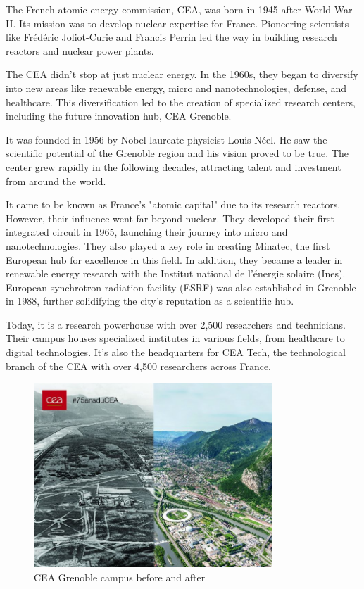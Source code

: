 \medskip

The French atomic energy commission, CEA, was born in 1945 after World War II. Its mission was to develop nuclear 
expertise for France. Pioneering scientists like Frédéric Joliot-Curie and Francis Perrin led the way in building 
research reactors and nuclear power plants.

\medskip

The CEA didn't stop at just nuclear energy. In the 1960s, they began to diversify into new areas like renewable energy,
 micro and nanotechnologies, defense, and healthcare. This diversification led to the creation of specialized research
 centers, including the future innovation hub, CEA Grenoble.

\medskip

It was founded in 1956 by Nobel laureate physicist Louis Néel. He saw the scientific potential of the Grenoble
region and his vision proved to be true. The center grew rapidly in the following decades, attracting talent and investment
from around the world.

\medskip

It came to be known as France's "atomic capital" due to its research reactors. However, their influence went far beyond
 nuclear. They developed their first integrated circuit in 1965, launching their journey into micro and nanotechnologies. 
 They also played a key role in creating Minatec, the first European hub for excellence in this field. In addition, they 
 became a leader in renewable energy research with the Institut national de l'énergie solaire (Ines).
 European synchrotron radiation facility (ESRF) was also established in Grenoble in 1988, further solidifying the city's
 reputation as a scientific hub.
\medskip

Today, it is a research powerhouse with over 2,500 researchers and technicians. Their campus houses specialized
 institutes in various fields, from healthcare to digital technologies. It's also the headquarters for CEA Tech, the
 technological branch of the CEA with over 4,500 researchers across France.

\begin{figure}[h!]
    \centering
    \includegraphics[width=0.8\textwidth]{images/old_new.jpg}
    \caption{CEA Grenoble campus before and after}
\end{figure}

